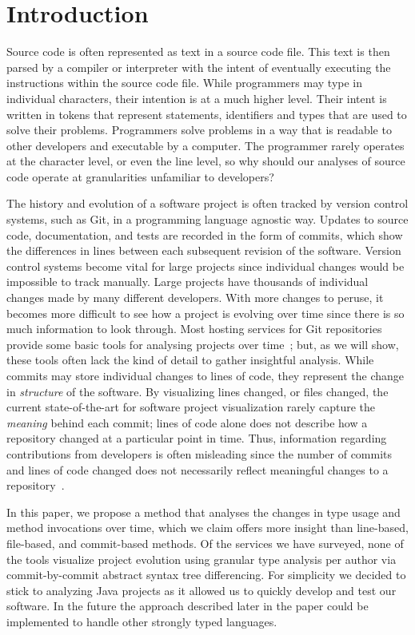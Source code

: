\documentclass[conference]{IEEEtran}
\begin{document}
\section{Introduction}

Source code is often represented as text in a source code file. This text is then parsed by a compiler or interpreter with the intent of eventually executing the instructions within the source code file. While programmers may type in individual characters, their intention is at a much higher level. Their intent is written in tokens that represent statements, identifiers and types that are used to solve their problems. Programmers solve problems in a way that is readable to other developers and executable by a computer. The programmer rarely operates at the character level, or even the line level, so why should our analyses of source code operate at granularities unfamiliar to developers?

The history and evolution of a software project is often tracked by version control systems, such as Git, in a programming language agnostic way. Updates to source code, documentation, and tests are recorded in the form of commits, which show the differences in lines between each subsequent revision of the software. Version control systems become vital for large projects since individual changes would be impossible to track manually. Large projects have thousands of individual changes made by many different developers. With more changes to peruse, it becomes more difficult to see how a project is evolving over time since there is so much information to look through. Most hosting services for Git repositories provide some basic tools for analysing projects over time~\cite{github-graphs,bitbucket-graphs}; but, as we will show, these tools often lack the kind of detail to gather insightful analysis. While commits may store individual changes to lines of code, they represent the change in \emph{structure} of the software.  By visualizing lines changed, or files changed, the current state-of-the-art for software project visualization rarely capture the \emph{meaning} behind each commit; lines of code alone does not describe how a repository changed at a particular point in time. Thus, information regarding contributions from developers is often misleading since the number of commits and lines of code changed does not necessarily reflect meaningful changes to a repository~\cite{robles2014}.

In this paper, we propose a method that analyses the changes in type usage and method invocations over time, which we claim offers more insight than line-based, file-based, and commit-based methods. Of the services we have surveyed, none of the tools visualize project evolution using granular type analysis per author via commit-by-commit abstract syntax tree differencing. For simplicity we decided to stick to analyzing Java projects as it allowed us to quickly develop and test our software. In the future the approach described later in the paper could be implemented to handle other strongly typed languages.
\end{document}
